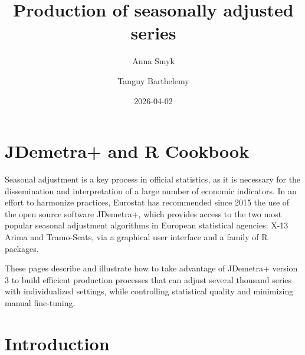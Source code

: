 \documentclass[
  letterpaper,
  DIV=11,
  numbers=noendperiod]{scrreprt}
\title{Production of seasonally adjusted series}
\author{Anna Smyk \and Tanguy Barthelemy}
\date{2026-04-02}
\renewcommand*\contentsname{Table of contents}
\newcommand\contentsname{Table of contents}
\begin{document}
\maketitle
\ifdefined\Shaded\renewenvironment{Shaded}{\begin{tcolorbox}[sharp corners, enhanced, frame hidden, boxrule=0pt, interior hidden, borderline west={3pt}{0pt}{shadecolor}, breakable]}{\end{tcolorbox}}\fi

\renewcommand*\contentsname{Table of contents}
{
\hypersetup{linkcolor=}
\setcounter{tocdepth}{2}
\tableofcontents
}

\hypertarget{ind}{%
\chapter*{JDemetra+ and R Cookbook}\label{ind}}


Seasonal adjustment is a key process in official statistics, as it is
necessary for the dissemination and interpretation of a large number of
economic indicators. In an effort to harmonize practices, Eurostat has
recommended since 2015 the use of the open source software JDemetra+,
which provides access to the two most popular seasonal adjustment
algorithms in European statistical agencies: X-13 Arima and Tramo-Seats,
via a graphical user interface and a family of R packages.

These pages describe and illustrate how to take advantage of JDemetra+
version 3 to build efficient production processes that can adjust
several thousand series with individualized settings, while controlling
statistical quality and minimizing manual fine-tuning.


\hypertarget{introduction}{%
\chapter*{Introduction}\label{introduction}}

\end{document}
